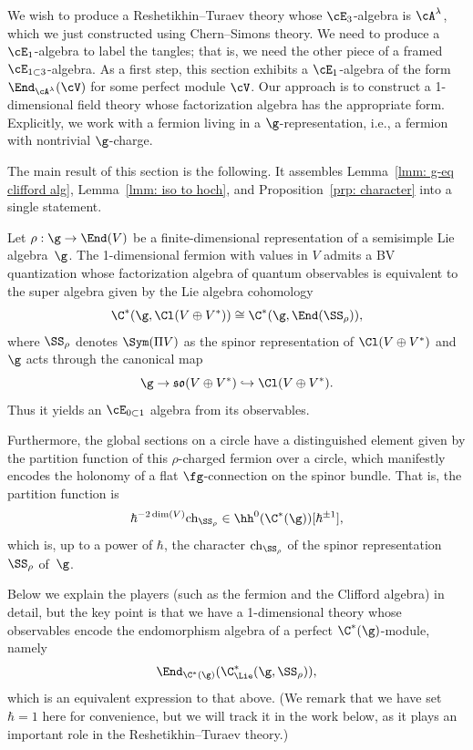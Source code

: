 \documentclass[10pt]{amsart}
\begin{document}
\def\ff{{\rm ff}}
\def\Ber{{\rm Ber}}

We wish to produce a Reshetikhin--Turaev theory whose $\cE_3$-algebra is $\cA^\lambda$,
which we just constructed using Chern--Simons theory.
We need to produce a $\cE_1$-algebra to label the tangles;
that is, we need the other piece of a framed $\cE_{1 \subset 3}$-algebra.
As a first step, this section exhibits a $\cE_1$-algebra of the form $\End_{\cA^\lambda}(\cV)$
for some perfect module $\cV$.
Our approach is to construct a 1-dimensional field theory whose factorization algebra has the appropriate form.
Explicitly, we work with a fermion living in a $\g$-representation,
i.e., a fermion with nontrivial $\g$-charge.

The main result of this section is the following.
It assembles Lemma~\ref{lmm: g-eq clifford alg}, Lemma~\ref{lmm: iso to hoch}, and Proposition~\ref{prp: character} into a single statement.

\begin{prp}
\label{prp: main ff}
Let $\rho: \g \to \End(V)$ be a finite-dimensional representation of a semisimple Lie algebra~$\g$.
The 1-dimensional fermion with values in $V$ admits a BV quantization
whose factorization algebra of quantum observables is equivalent to the super algebra given by the Lie algebra cohomology
\[
\C^*(\g,\Cl(V \oplus V^*)) \cong \C^*(\g, \End(\SS_\rho)),
\]
where $\SS_\rho$ denotes $\Sym (\Pi V)$ as the spinor representation of $\Cl(V \oplus V^*)$ and $\g$ acts through the canonical map 
\[
\g \to \mathfrak{so}(V \oplus V^*) \hookrightarrow \Cl(V \oplus V^*).
\]
Thus it yields an $\cE_{0 \subset 1}$ algebra from its observables.

Furthermore, the global sections on a circle have a distinguished element
given by the partition function of this $\rho$-charged fermion over a circle,
which manifestly encodes the holonomy of a flat $\fg$-connection on the spinor bundle.
That is, the partition function is
\[
\hbar^{-2\dim(V)}{\rm ch}_{\SS_\rho} \in \hh^0(\C^*(\g))[\hbar^{\pm 1}],
\] 
which is, up to a power of $\hbar$, the character ${\rm ch}_{\SS_\rho}$ of the spinor representation $\SS_\rho$ of~$\g$.
\end{prp}

Below we explain the players (such as the fermion and the Clifford algebra) in detail, 
but the key point is that we have a 1-dimensional theory whose observables encode the endomorphism algebra of a perfect $\C^*(\g)$-module, 
namely
\[
\End_{\C^*(\g)}(\C^*_{\Lie}(\g, \SS_\rho)),
\]
which is an equivalent expression to that above.
(We remark that we have set $\hbar = 1$ here for convenience, 
but we will track it in the work below, as it plays an important role in the Reshetikhin--Turaev theory.)
\end{document}
